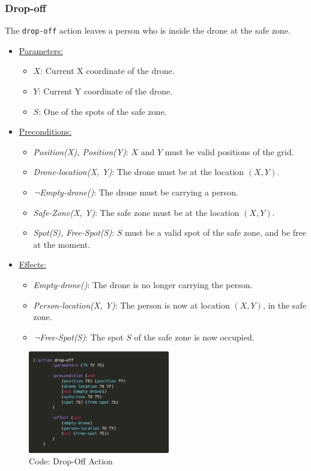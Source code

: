 \documentclass{article}
\begin{document}
\subsubsection{Drop-off}
The \texttt{drop-off} action leaves a person who is inside the drone at the safe zone.
\begin{itemize}
    \item \underline{Parameters:}
    \begin{itemize}
        \item $X$: Current X coordinate of the drone.
        \item $Y$: Current Y coordinate of the drone.
        \item $S$: One of the spots of the safe zone.
    \end{itemize}
    \item \underline{Preconditions:}
    \begin{itemize}
        \item \textit{Position(X), Position(Y)}: $X$ and $Y$ must be valid positions of the grid.
        \item \textit{Drone-location(X, Y)}: The drone must be at the location $(X, Y)$.
        \item \textit{¬Empty-drone()}: The drone must be carrying a person.
        \item \textit{Safe-Zone(X, Y)}: The safe zone must be at the location $(X, Y)$.
        \item \textit{Spot(S), Free-Spot(S)}: $S$ must be a valid spot of the safe zone, and be free at the moment.
    \end{itemize}
    \item \underline{Effects:}
    \begin{itemize}
        \item \textit{Empty-drone()}: The drone is no longer carrying the person.
        \item \textit{Person-location(X, Y)}: The person is now at location $(X, Y)$, in the safe zone.
        \item \textit{¬Free-Spot(S)}: The spot $S$ of the safe zone is now occupied.
    \end{itemize}
\end{itemize}
\begin{figure}[H]
    \centering
    \includegraphics[width=0.55\textwidth]{assets/solution_coordinates/drop-off.png}
    \caption{Code: Drop-Off Action}
    \label{fig:act:drop-off}
\end{figure}
\end{document}
